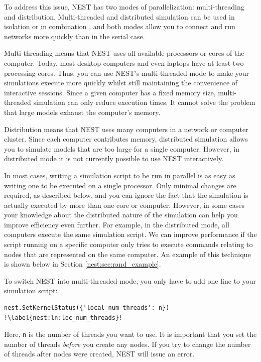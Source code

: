 \documentclass{article}
\begin{document}
To address this issue, NEST has two modes of parallelization:
multi-threading and distribution. Multi-threaded and distributed
simulation can be used in isolation or in combination
\citep{Ples:2007(672)}, and both modes allow you to connect and run
networks more quickly than in the serial case.  

Multi-threading means that NEST uses all
available processors or cores of the computer. Today, most desktop
computers and even laptops have at least two processing cores. Thus,
you can use NEST's multi-threaded mode to make your simulations
execute more quickly whilst still maintaining the convenience of
interactive sessions. Since a given computer has a fixed memory size,
multi-threaded simulation can only reduce execution times. It cannot
solve the problem that large models exhaust the computer's memory.

Distribution means that NEST uses
many computers in a network or computer cluster. Since each computer
contributes memory, distributed simulation allows you to simulate
models that are too large for a single computer. However, in
distributed mode it is not currently possible to use NEST
interactively.

In most cases, writing a simulation script to be run in parallel is as
easy as writing one to be executed on a single processor. Only minimal
changes are required, as described below, and you can ignore the fact
that the simulation is actually executed by more than one core or
computer. However, in some cases your knowledge about the distributed
nature of the simulation can help you improve efficiency even
further. For example, in the distributed mode, all computers execute
the same simulation script. We can improve performance if the
script running on a specific computer only tries to execute commands
relating to nodes that are represented on the
same computer. An example of this technique is shown below in Section
\ref{nest:sec:rand_example}.

To switch NEST into
multi-threaded mode, you only have to add one line to your simulation
script:
\begin{lstlisting}[numbers=none]
nest.SetKernelStatus({'local_num_threads': n}) !\label{nest:ln:loc_num_threads}!
\end{lstlisting}
Here, \lstinline!n! is the number of threads you want to use. It is
important that you set the number of threads \emph{before} you create
any nodes. If you try to change the number of threads after nodes were
created, NEST will issue an error.
\end{document}
